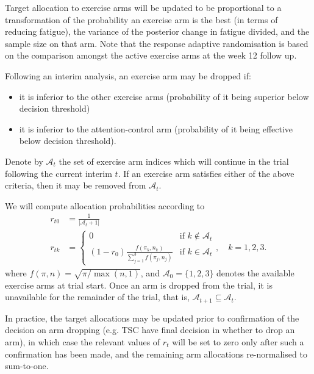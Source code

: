 \documentclass[11pt,parskip=half-]{scrartcl}
\providecommand{\tightlist}{%
  \setlength{\itemsep}{0pt}\setlength{\parskip}{0pt}}
\begin{document}
Target allocation to exercise arms will be updated to be proportional to a transformation of the probability an exercise arm is the best (in terms of reducing fatigue), the variance of the posterior change in fatigue divided, and the sample size on that arm. Note that the response adaptive randomisation is based on the comparison amongst the active exercise arms at the week 12 follow up.

Following an interim analysis, an exercise arm may be dropped if:
\begin{itemize}\tightlist
  \item it is inferior to the other exercise arms (probability of it being superior below decision threshold)
  \item it is inferior to the attention-control arm (probability of it being effective below decision threshold).
\end{itemize}

Denote by $\mathcal{A}_t$ the set of exercise arm indices which will continue in the trial following the current interim $t$. If an exercise arm satisfies either of the above criteria, then it may be removed from $\mathcal{A}_t$.

We will compute allocation probabilities according to
$$
  \begin{aligned}
    r_{t0} & = \frac{1}{|\mathcal{A}_t + 1|}              \\
    r_{tk} & = \begin{cases}
      0                                                          & \text{if } k \notin \mathcal{A}_t \\
      (1 - r_0) \frac{f(\pi_k, n_k)}{\sum_{j=1}^3 f(\pi_j, n_j)} & \text{if }k\in\mathcal{A}_t
    \end{cases}, \quad k=1,2,3.
  \end{aligned}
$$
where $f(\pi, n) = \sqrt{\pi/\max(n,1)}$, and $\mathcal{A}_0 = \{1,2,3\}$ denotes the available exercise arms at trial start. Once an arm is dropped from the trial, it is unavailable for the remainder of the trial, that is, $\mathcal{A}_{t+1} \subseteq \mathcal{A}_t$.

In practice, the target allocations may be updated prior to confirmation of the decision on arm dropping (e.g. TSC have final decision in whether to drop an arm), in which case the relevant values of $r_t$ will be set to zero only after such a confirmation has been made, and the remaining arm allocations re-normalised to sum-to-one.
\end{document}
